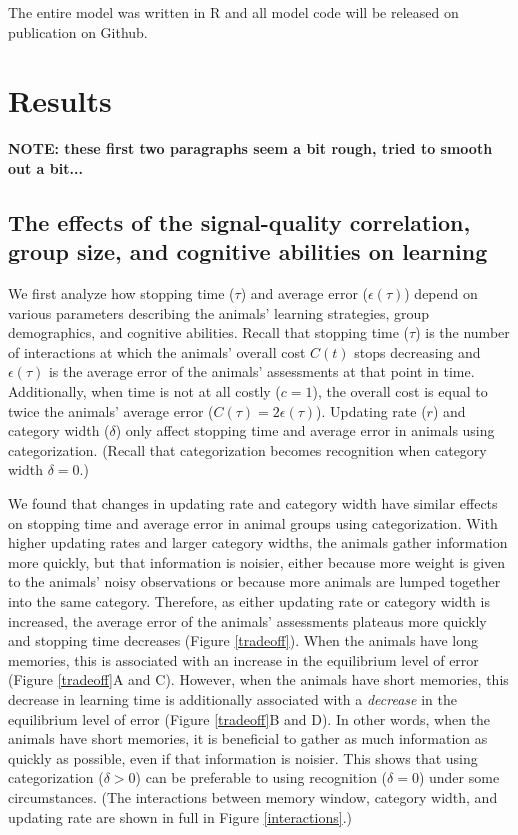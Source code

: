 The entire model was written in R and all model code will be released on publication on Github.

\section*{Results}
\textbf{NOTE: these first two paragraphs seem a bit rough, tried to smooth out a bit...}

\subsection*{The effects of the signal-quality correlation, group size, and cognitive abilities on learning}
We first analyze how stopping time ($\tau$)  and average error ($\epsilon(\tau)$) depend on various parameters describing the animals' learning strategies, group demographics, and cognitive abilities. Recall that stopping time ($\tau$) is the number of interactions at which the animals' overall cost $C(t)$ stops decreasing and $\epsilon(\tau)$ is the average error of the animals' assessments at that point in time. Additionally, when time is not at all costly ($c=1$), the overall cost is equal to twice the animals' average error ($C(\tau)=2\epsilon(\tau)$). Updating rate ($r$) and category width ($\delta$) only affect stopping time and average error in animals using categorization. (Recall that categorization becomes recognition when category width $\delta=0$.) 

We found that changes in updating rate and category width have similar effects on stopping time and average error in animal groups using categorization. With higher updating rates and larger category widths, the animals gather information more quickly, but that information is noisier, either because more weight is given to the animals' noisy observations or because more animals are lumped together into the same category. Therefore, as either updating rate or category width is increased, the average error of the animals' assessments plateaus more quickly and stopping time decreases (Figure \ref{tradeoff}). When the animals have long memories, this is associated with an increase in the equilibrium level of error (Figure \ref{tradeoff}A and C). However, when the animals have short memories, this decrease in learning time is additionally associated with a \emph{decrease} in the equilibrium level of error (Figure \ref{tradeoff}B and D). In other words, when the animals have short memories, it is beneficial to gather as much information as quickly as possible, even if that information is noisier. This shows that using categorization ($\delta>0$) can be preferable to using recognition ($\delta=0$) under some circumstances. (The interactions between memory window, category width, and updating rate are shown in full in Figure \ref{interactions}.)

